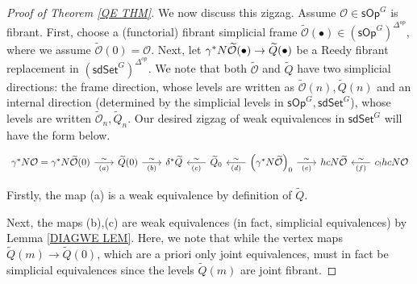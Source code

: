 \documentclass[a4paper,10pt
,draft
]{article}%
\numberwithin{equation}{section}
\numberwithin{figure}{section}
\theoremstyle{definition} %
\renewcommand{\O}{\ensuremath{\mathcal O}}
\newcommand{\1}{\ensuremath{\mathbbm 1}}%
\begin{document}
\begin{proof}[Proof of Theorem \ref{QE THM}]
We now discuss this zigzag. Assume 
$\mathcal{O} \in \mathsf{sOp}^G$ is fibrant.
First, choose a (functorial) fibrant simplicial frame
$\widetilde{\mathcal{O}}(\bullet) \in (\mathsf{sOp}^G)^{\Delta^{op}}$, where we assume $\widetilde{\mathcal{O}} (0) = \mathcal{O}$.
Next, let 
$\gamma^{\**} N \widetilde{\mathcal{O}}(\bullet) 
\to \widetilde{Q}(\bullet)$
be a Reedy fibrant replacement in  
$(\mathsf{sdSet}^G)^{\Delta^{op}}$.
We note that 
both $\widetilde{\O}$ and $\widetilde{Q}$
have two simplicial directions:
the frame direction, whose levels are written as
$\widetilde{\O}(n),\widetilde{Q}(n)$
and an internal direction
(determined by the simplicial levels in $\mathsf{sOp}^G,\mathsf{sdSet}^G$),
whose levels are written 
$\widetilde{\O}_n,\widetilde{Q}_n$.
Our desired zigzag of weak equivalences in $\mathsf{sdSet}^G$
will have the form below.
\begin{equation}\label{BIGZIG EQ}
\begin{tikzcd}[column sep =20pt]
	\gamma^{\**} N \mathcal{O} =
	\gamma^{\**} N \widetilde{\mathcal{O}} (0)
	\ar{r}{\sim}[swap]{(a)}
&
	\widetilde{Q}(0)
	\ar{r}{\sim}[swap]{(b)}
&
	\delta^{\**} \widetilde{Q}
	\ar[leftarrow]{r}{\sim}[swap]{(c)}
&	
	\widetilde{Q}_0
	\ar[leftarrow]{r}{\sim}[swap]{(d)}
&
	\left(\gamma^{\**} N \widetilde{\mathcal{O}}\right)_0
		\ar{r}{\sim}[swap]{(e)}
&
	hcN \widetilde{\mathcal{O}}
	\ar[leftarrow]{r}{\sim}[swap]{(f)}
&
	c_{!} hcN \mathcal{O}
\end{tikzcd}
\end{equation}

Firstly, the map (a) is a weak equivalence by definition of 
$\widetilde{Q}$.

Next, the maps 
(b),(c) are weak equivalences (in fact, simplicial equivalences)
by Lemma \ref{DIAGWE LEM}. 
Here, we note that while the vertex maps 
$\widetilde{Q}(m) \to \widetilde{Q}(0)$,
which are a priori only joint equivalences,
must in fact be simplicial equivalences since the 
levels $\widetilde{Q}(m)$ are joint fibrant.



\end{proof}
\end{document}
